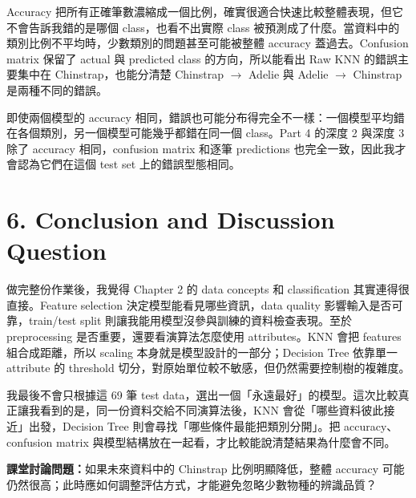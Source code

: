Accuracy 把所有正確筆數濃縮成一個比例，確實很適合快速比較整體表現，但它不會告訴我錯的是哪個 class，也看不出實際 class 被預測成了什麼。當資料中的類別比例不平均時，少數類別的問題甚至可能被整體 accuracy 蓋過去。Confusion matrix 保留了 actual 與 predicted class 的方向，所以能看出 Raw KNN 的錯誤主要集中在 Chinstrap，也能分清楚 Chinstrap $\rightarrow$ Adelie 與 Adelie $\rightarrow$ Chinstrap 是兩種不同的錯誤。

即使兩個模型的 accuracy 相同，錯誤也可能分布得完全不一樣：一個模型平均錯在各個類別，另一個模型可能幾乎都錯在同一個 class。Part 4 的深度 2 與深度 3 除了 accuracy 相同，confusion matrix 和逐筆 predictions 也完全一致，因此我才會認為它們在這個 test set 上的錯誤型態相同。

\section*{6. Conclusion and Discussion Question}
\sectionrule

做完整份作業後，我覺得 Chapter 2 的 data concepts 和 classification 其實連得很直接。Feature selection 決定模型能看見哪些資訊，data quality 影響輸入是否可靠，train/test split 則讓我能用模型沒參與訓練的資料檢查表現。至於 preprocessing 是否重要，還要看演算法怎麼使用 attributes。KNN 會把 features 組合成距離，所以 scaling 本身就是模型設計的一部分；Decision Tree 依靠單一 attribute 的 threshold 切分，對原始單位較不敏感，但仍然需要控制樹的複雜度。

我最後不會只根據這 69 筆 test data，選出一個「永遠最好」的模型。這次比較真正讓我看到的是，同一份資料交給不同演算法後，KNN 會從「哪些資料彼此接近」出發，Decision Tree 則會尋找「哪些條件最能把類別分開」。把 accuracy、confusion matrix 與模型結構放在一起看，才比較能說清楚結果為什麼會不同。

\textbf{課堂討論問題：}如果未來資料中的 Chinstrap 比例明顯降低，整體 accuracy 可能仍然很高；此時應如何調整評估方式，才能避免忽略少數物種的辨識品質？
